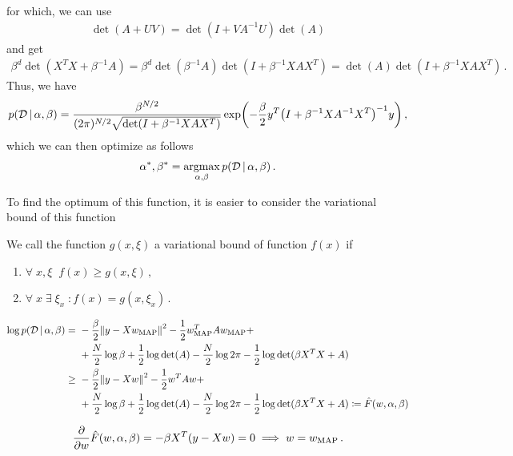 for which, we can use
\begin{align}
    \det(A + UV) = \det(I + VA^{-1}U)\det(A)
\end{align}
and get
\begin{align}
    \beta^d\det\left(X^TX + \beta^{-1}A\right) = \beta^d\det(\beta^{-1}A)\det(I + \beta^{-1}XAX^T) = \det(A)\det(I + \beta^{-1}XAX^T)\,.
\end{align}
Thus, we have
\begin{align}
    p(\mathcal{D}\cond \alpha,\beta) = \frac{\beta^{N/2}}{(2\pi)^{N/2}\sqrt{\det(I + \beta^{-1}XAX^T)}}\exp\left(-\frac{\beta}{2}y^T\left(I + \beta^{-1}XA^{-1}X^T\right)^{-1}y\right)\,,
\end{align}
which we can then optimize as follows
\begin{align}
    \alpha^*,\beta^* = \operatorname*{argmax}_{\alpha,\beta} p(\mathcal{D}\,|\, \alpha,\beta)\,.
\end{align}

To find the optimum of this function, it is easier to consider the variational bound of this function
\begin{mybox}
    \begin{definition}\label{def:var_bound}
    We call the function $g(x,\xi)$ a variational bound of function $f(x)$ if
    \begin{enumerate}
        \item $\forall \; x,\xi\;\; f(x) \geq g(x,\xi)\,,$
        \item $\forall \; x\; \exists\; \xi_x \; : f(x) = g(x,\xi_x)\,.$
    \end{enumerate}
    \end{definition}
\end{mybox}

\begin{align}
    \log p(\mathcal{D}\cond \alpha,\beta) =~& -\frac{\beta}{2}\norm{y-Xw_{\text{MAP}}}^2 - \frac{1}{2}w_{\text{MAP}}^TAw_{\text{MAP}} + \\
    ~&+ \frac{N}{2}\log \beta + \frac{1}{2}\log \det(A) - \frac{N}{2}\log 2\pi - \frac{1}{2}\log \det(\beta X^TX + A)\\
    \geq~& -\frac{\beta}{2}\norm{y-Xw}^2 - \frac{1}{2}w^TAw + \\
    ~&+ \frac{N}{2}\log \beta + \frac{1}{2}\log \det(A) - \frac{N}{2}\log 2\pi - \frac{1}{2}\log \det(\beta X^TX + A) \coloneqq \hat{F}(w,\alpha,\beta)
\end{align}

\begin{align}
    \frac{\partial }{\partial w}\hat{F}(w,\alpha,\beta) = -\beta X^T(y - Xw) = 0 \implies w = w_{\text{MAP}}\,.
\end{align}

